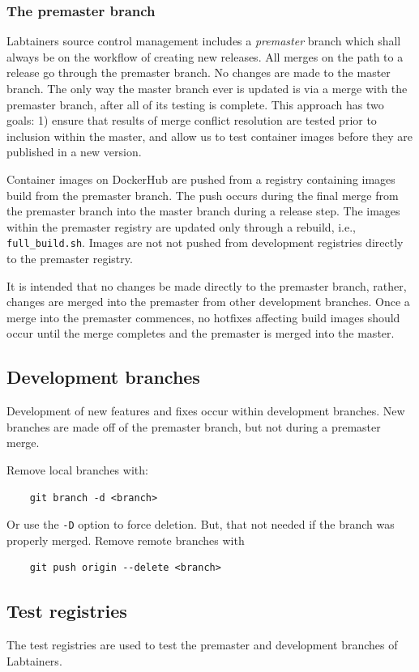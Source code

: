 \documentclass[12pt]{article}
\begin{document}
\subsubsection{The premaster branch}
Labtainers source control management includes a \textit{premaster} branch which shall always be on the workflow of 
creating new releases. All merges on the path to a release go through the premaster branch.  No changes are made to the master
branch.  The only way the master branch ever is updated is via a merge with the premaster branch, after all of its testing is 
complete.  This approach has two goals: 1) ensure that results of merge conflict resolution are tested prior to 
inclusion within the master, and allow us to test container images before they are published in a new version.  

Container images on DockerHub are
pushed from a registry containing images build from the premaster branch. The push occurs during the final merge from the
premaster branch into the master branch during a release step.  The images within the premaster registry are updated only through
a rebuild, i.e., {\tt full\_build.sh}.  Images are not not pushed from development registries directly to the premaster registry.

It is intended that no changes be made directly to the premaster branch, rather, changes are merged into the premaster from
other development branches.  Once a merge into the premaster commences, no hotfixes affecting build images should occur until
the merge completes and the premaster is merged into the master.

\subsection{Development branches}
Development of new features and fixes occur within development branches.
New branches are made off of the premaster branch, but not during a premaster merge.

Remove local branches with:
\begin{verbatim}
    git branch -d <branch>
\end{verbatim}
\noindent Or use the {\tt -D} option to force deletion.  But, that not needed if the branch was properly merged.
Remove remote branches with 
\begin{verbatim}
    git push origin --delete <branch>
\end{verbatim}

\subsection{Test registries}
The test registries are used to test the premaster and development branches of Labtainers.
\end{document}
